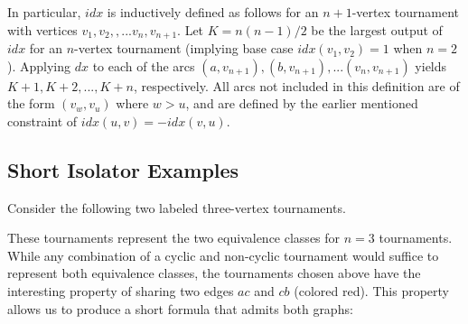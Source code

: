 \documentclass[conference]{IEEEtran}
\begin{document}
In particular, $\mathit{idx}$ is inductively defined as follows for an $n+1$-vertex tournament with vertices $v_1, v_2,,...v_n, v_{n+1}$. Let $K = n(n-1)/2$ be the largest output of $\mathit{idx}$ for an $n$-vertex tournament (implying base case $\mathit{idx}(v_1,v_2) = 1$ when $n=2$). Applying $\mathit{dx}$ to each of the arcs $(a,v_{n+1}), (b,v_{n+1}), ... (v_n, v_{n+1})$ yields $K+1, K+2,...,K+n$, respectively. All arcs not included in this definition are of the form $(v_w, v_u)$ where $w>u$, and are defined by the earlier mentioned constraint of $\mathit{idx}(u,v) = -\mathit{idx}(v,u)$.


\subsection{Short Isolator Examples}
Consider the following two labeled three-vertex tournaments.

\noindent
{}

These tournaments represent the two equivalence classes for $n=3$ tournaments. While any combination of a cyclic and non-cyclic tournament would suffice to represent both equivalence classes, the tournaments chosen above have the interesting property of sharing two edges $ac$ and $cb$ (colored red). This property allows us to produce a short formula that admits both graphs:
\end{document}
